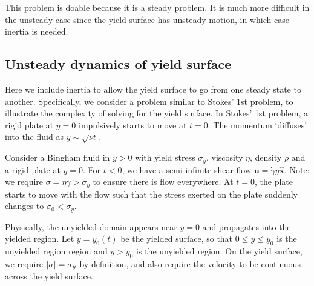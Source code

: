 \documentclass{jknotes}
\newcommand{\srate}{\dot{\gamma}}
\renewcommand{\u}{\bm{u}}
\begin{document}
This problem is doable because it is a steady problem. It is much more
difficult in the unsteady case since the yield surface has unsteady motion, in
which case inertia is needed.

\subsection{Unsteady dynamics of yield surface}
Here we include inertia to allow the yield surface to go from one steady state
to another. Specifically, we consider a problem similar to Stokes' 1st
problem, to illustrate the complexity of solving for the yield surface. In
Stokes' 1st problem, a rigid plate at $y=0$ impulsively starts to move at
$t=0$. The momentum `diffuses' into the fluid as $y \sim \sqrt{\nu t}$.

Consider a Bingham fluid in $y > 0$ with yield stress $\sigma_y$, viscosity
$\eta$, density $\rho$ and a rigid plate at $y=0$. For $t < 0$, we have a
semi-infinite shear flow $\u = \srate y \hat{\bm{x}}$. Note: we require
$\sigma = \eta \srate > \sigma_y$ to ensure there is flow everywhere. At
$t=0$, the plate starts to move with the flow such that the stress exerted on
the plate suddenly changes to $\sigma_0 < \sigma_y$. 

\begin{center}
\end{center}

Physically, the unyielded domain appears near $y=0$ and propagates into the
yielded region. Let $y=y_0(t)$ be the yielded surface, so that $0 \le y \le
y_0$ is the unyielded region region and $y > y_0$ is the unyielded region. On
the yield surface, we require $\abs{\sigma} = \sigma_y$ by definition, and
also require the velocity to be continuous across the yield surface.
\end{document}
